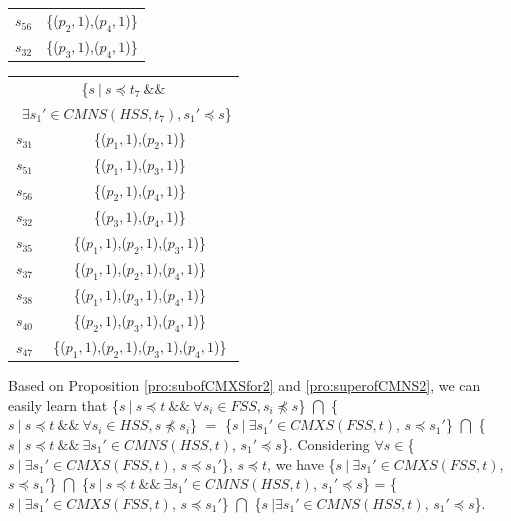 {\begin{table}[htbp]
\begin{tabular}{|c|c|}
   $s_{56}$ & \{($p_{2}, 1$),($p_{4}, 1$)\} \\
   $s_{32}$ & \{($p_{3}, 1$),($p_{4}, 1$)\} \\
    \hline
    \end{tabular}%
\quad
    \begin{tabular}{|c|c|} \hline

   \multicolumn{2}{|c|}{ \{$ s\ |\ s \preceq t_{7}\ \&\& $ }\\
   \multicolumn{2}{|c|}{\ $\exists s_{1}' \in CMNS(HSS, t_{7}), s_{1}' \preceq s$\} }\\ \hline

   $s_{31}$ & \{($p_{1}, 1$),($p_{2}, 1$)\} \\
   $s_{51}$ & \{($p_{1}, 1$),($p_{3}, 1$)\} \\

   $s_{56}$ & \{($p_{2}, 1$),($p_{4}, 1$)\} \\
   $s_{32}$ & \{($p_{3}, 1$),($p_{4}, 1$)\} \\

   $s_{35}$ & \{($p_{1}, 1$),($p_{2}, 1$),($p_{3}, 1$)\} \\
   $s_{37}$ & \{($p_{1}, 1$),($p_{2}, 1$),($p_{4}, 1$)\} \\
   $s_{38}$ & \{($p_{1}, 1$),($p_{3}, 1$),($p_{4}, 1$)\} \\
   $s_{40}$ & \{($p_{2}, 1$),($p_{3}, 1$),($p_{4}, 1$)\} \\

   $s_{47}$ & \{($p_{1}, 1$),($p_{2}, 1$),($p_{3}, 1$),($p_{4}, 1$)\} \\ \hline
    \end{tabular}%
\end{table}


Based on Proposition \ref{pro:subofCMXSfor2} and \ref{pro:superofCMNS2}, we can easily learn that \{$s\ |\ s \preceq t\ \&\&\ \forall s_{i} \in FSS, s_{i} \npreceq s $\} $\bigcap$ \{$s\ |\ s \preceq t\ \&\&\ \forall s_{i} \in HSS, s \npreceq s_{i} $\}  $=$  \{$ s\ |\ \exists s_{1}' \in CMXS(FSS, t)$, $s \preceq s_{1}'$\} $\bigcap$  \{$ s\ |\ s \preceq t \ \&\& \ \exists s_{1}' \in CMNS(HSS, t)$, $s_{1}' \preceq s$\}.  Considering $\forall s \in $\{$ s\ |\ \exists s_{1}' \in CMXS(FSS, t)$, $s \preceq s_{1}'$\}, $s \preceq t$, we have  \{$ s\ |\ \exists s_{1}' \in CMXS(FSS, t)$, $s \preceq s_{1}'$\} $\bigcap$  \{$ s\ |\ s \preceq t \ \&\& \ \exists s_{1}' \in CMNS(HSS, t)$, $s_{1}' \preceq s$\} =  \{$ s\ |\ \exists s_{1}' \in CMXS(FSS, t)$, $s \preceq s_{1}'$\} $\bigcap$  \{$ s\ | \exists s_{1}' \in CMNS(HSS, t)$, $s_{1}' \preceq s$\}.

}
